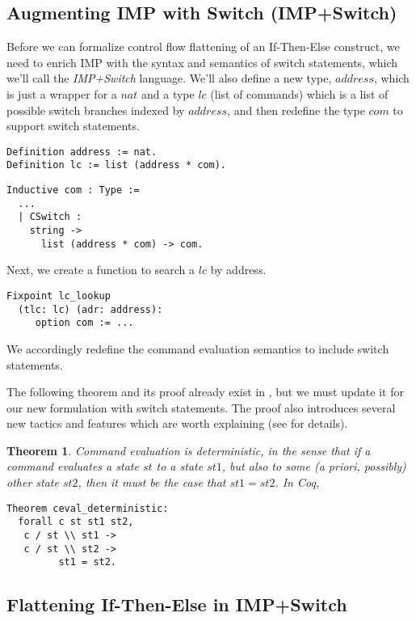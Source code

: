\documentclass[compsoc,conference,a4paper,10pt,times]{IEEEtran}
\newtheorem{theorem}{Theorem}[section]
\begin{document}
\subsection{Augmenting IMP with Switch (IMP+Switch)}\label{4.2}
Before we can formalize control flow flattening of an If-Then-Else construct, we need to enrich IMP with the syntax and semantics of switch statements, which we'll call the \emph{IMP+Switch} language.  We'll also define a new type, $address$, which is just a wrapper for a $nat$ and a type $lc$ (list of commands) which is a list of possible switch branches indexed by $address$, and then redefine the type $com$ to support switch statements.

\begin{verbatim}
Definition address := nat.
Definition lc := list (address * com).
\end{verbatim}

\begin{verbatim}
Inductive com : Type :=
  ...
  | CSwitch : 
    string -> 
      list (address * com) -> com.
\end{verbatim}

Next, we create a function to search a $lc$ by address.
\begin{verbatim}
Fixpoint lc_lookup 
  (tlc: lc) (adr: address): 
     option com := ... 
\end{verbatim}

We accordingly redefine the command evaluation semantics to include switch statements.

The following theorem and its proof already exist in \cite{SFV2}, but we must update it for our new formulation with switch statements.  The proof also introduces several new tactics and features which are worth explaining (see \cite{Weyun} for details).

\begin{theorem}\label{deterministic}
Command evaluation is deterministic, in the sense that if a command evaluates a state $st$ to a state $st1$, but also to some (a priori, possibly) other state $st2$, then it must be the case that $st1 = st2$.  In Coq,
\begin{verbatim}
Theorem ceval_deterministic: 
  forall c st st1 st2,
   c / st \\ st1 -> 
   c / st \\ st2 -> 
         st1 = st2.
\end{verbatim}
\end{theorem}

\subsection{Flattening If-Then-Else in IMP+Switch}\label{flattenif}\label{4.3}
\end{document}
